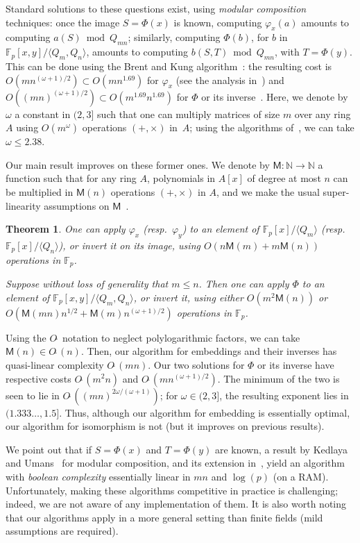\documentclass{sig-alternate}
\def\M {\ensuremath{\mathsf{M}}}
\def\N {\ensuremath{\mathbb{N}}}
\def\F {\ensuremath{\mathbb{F}}}
\newcounter{algo}
\newcommand{\ang}[1]{\langle#1\rangle}
\newtheorem{Theo}{Theorem}
\begin{document}
Standard solutions to these questions exist, using {\em modular
  composition} techniques: once the image $S=\Phi(x)$ is known,
computing $\varphi_x(a)$ amounts to computing $a(S) \bmod Q_{mn}$;
similarly, computing $\Phi(b)$, for $b$ in $\F_p[x,y]/\ang{Q_m,Q_n}$,
amounts to computing $b(S,T) \bmod Q_{mn}$, with $T=\Phi(y)$.  This
can be done using the Brent and Kung algorithm~\cite{brent+kung}: the
resulting cost is $O(m n^{(\omega+1)/2}) \subset O(m n^{1.69})$ for
$\varphi_x$ (see the analysis in~\cite{shoup94}) and $O((m
n)^{(\omega+1)/2}) \subset O(m^{1.69} n^{1.69})$ for $\Phi$ or its
inverse~\cite{PoSc13b}. Here, we denote by $\omega$ a constant in
$(2,3]$ such that one can multiply matrices of size $m$ over any ring
  $A$ using $O(m^\omega)$ operations $(+,\times)$ in~$A$; using the
  algorithms of~\cite{coppersmith+winograd,Williams12}, we can take
  $\omega \le 2.38$.

Our main result improves on these former ones. We denote by $\M:\N \to
\N$ a function such that for any ring $A$, polynomials in $A[x]$ of
degree at most $n$ can be multiplied in $\M(n)$ operations
$(+,\times)$ in $A$, and we make the usual super-linearity assumptions
on $\M$~\cite[Chapter~8]{vzGG}.
\begin{Theo}\label{theo:main}
  One can apply $\varphi_x$ (resp.\ $\varphi_y$) to an element of
  $\F_p[x]/\ang{Q_m}$ (resp.\ $\F_p[x]/\ang{Q_n}$), or invert it on its
  image, using $O(n\M(m)+m\M(n))$ operations in $\F_p$.

  Suppose without loss of generality that $m \le n$. Then one can
  apply $\Phi$ to an element of $\F_p[x,y]/\ang{Q_m, Q_n}$, or invert it, using either
  $O(m^2 \M(n))$ or $O(\M(mn)n^{1/2}+\M(m) n^{(\omega+1)/2} )$
  operations in $\F_p$.
\end{Theo}

Using the $O\tilde{~}$ notation to neglect polylogarithmic factors, we
can take $\M(n) \in O\tilde{~}(n)$.  Then, our algorithm for
embeddings and their inverses has quasi-linear complexity
$O\tilde{~}(mn)$. Our two solutions for $\Phi$ or its inverse have
respective costs $O\tilde{~}(m^2 n)$ and $O\tilde{~}(m
n^{(\omega+1)/2})$. The minimum of the two is seen to lie in
$O\tilde{~}( (mn)^{2\omega/(\omega+1)})$; for $\omega \in (2,3]$, the
resulting exponent lies in $(1.333\dots, 1.5]$.  Thus, although our
algorithm for embedding is essentially optimal, our algorithm for
isomorphism is not (but it improves on previous results).

We point out that if $S=\Phi(x)$ and $T=\Phi(y)$ are known, a result
by Kedlaya and Umans~\cite{KeUm11} for modular composition, and its
extension in~\cite{PoSc13a}, yield an algorithm with {\em boolean
  complexity} essentially linear in $mn$ and $\log(p)$ (on a
RAM). Unfortunately, making these algorithms competitive in practice
is challenging; indeed, we are not aware of any implementation of
them. It is also worth noting that our algorithms apply in a more
general setting than finite fields (mild assumptions are required).
\end{document}
